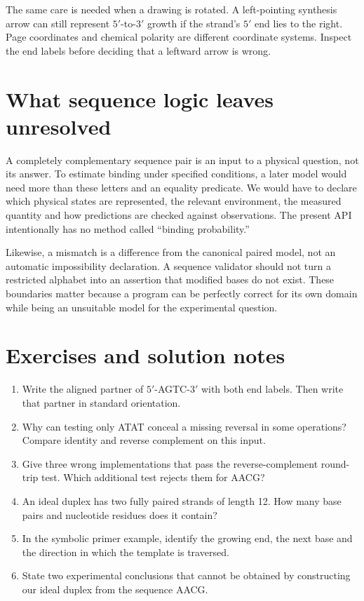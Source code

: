 The same care is needed when a drawing is rotated. A left-pointing synthesis
arrow can still represent $5'$-to-$3'$ growth if the strand's $5'$ end lies to
the right. Page coordinates and chemical polarity are different coordinate
systems. Inspect the end labels before deciding that a leftward arrow is wrong.

\section{What sequence logic leaves unresolved}
A completely complementary sequence pair is an input to a physical question,
not its answer. To estimate binding under specified conditions, a later model
would need more than these letters and an equality predicate. We would have
to declare which physical states are represented, the relevant environment,
the measured quantity and how predictions are checked against observations.
The present API intentionally has no method called ``binding probability.''

Likewise, a mismatch is a difference from the canonical paired model, not an
automatic impossibility declaration. A sequence validator should not turn a
restricted alphabet into an assertion that modified bases do not exist. These
boundaries matter because a program can be perfectly correct for its own
domain while being an unsuitable model for the experimental question.

\section{Exercises and solution notes}
\begin{enumerate}
\item Write the aligned partner of $5'$-AGTC-$3'$ with both end labels. Then
write that partner in standard orientation.
\item Why can testing only ATAT conceal a missing reversal in some operations?
Compare identity and reverse complement on this input.
\item Give three wrong implementations that pass the reverse-complement
round-trip test. Which additional test rejects them for AACG?
\item An ideal duplex has two fully paired strands of length 12. How many
base pairs and nucleotide residues does it contain?
\item In the symbolic primer example, identify the growing end, the next base
and the direction in which the template is traversed.
\item State two experimental conclusions that cannot be obtained by constructing
our ideal duplex from the sequence AACG.
\end{enumerate}

